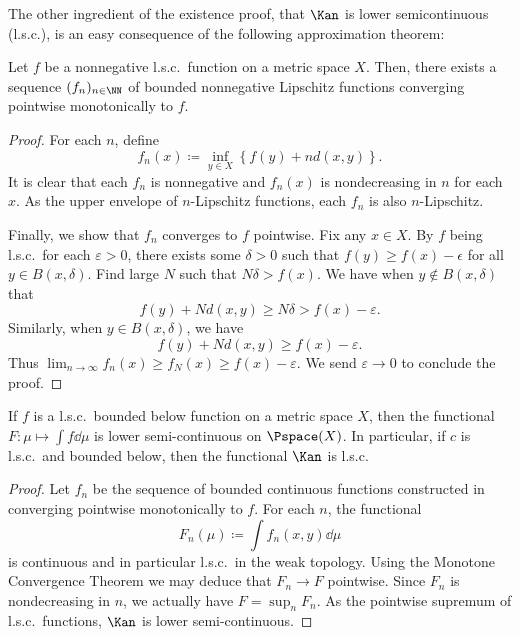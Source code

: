 \documentclass[oneside,reqno,letterpaper]{amsart}
\begin{document}
The other ingredient of the existence proof, that \(\Kan\) is lower semicontinuous (l.s.c.), is an easy consequence of the following approximation theorem:
\begin{lemma}\label{prop:lsc-approx-by-uc}
  Let \(f\) be a nonnegative l.s.c.\ function on a metric space \(X\).
  Then, there exists a sequence \((f_n)_{n \in \NN}\) of bounded nonnegative Lipschitz functions converging pointwise monotonically to \(f\).
\end{lemma}
\begin{proof}
  For each \(n\), define
  \[
    f_n(x) \coloneqq \inf_{y \in X} \left\{ f(y) + n d(x, y) \right\}.
  \]
  It is clear that each \(f_n\) is nonnegative and \(f_n(x)\) is nondecreasing in \(n\) for each \(x\).
  As the upper envelope of \(n\)-Lipschitz functions, each \(f_n\) is also \(n\)-Lipschitz.

  Finally, we show that \(f_n\) converges to \(f\) pointwise.
  Fix any \(x \in X\).
  By \(f\) being l.s.c.\, for each \(\varepsilon > 0\), there exists some \(\delta > 0\) such that \(f(y) \geq f(x) - \epsilon\) for all \(y \in B(x, \delta)\).
  Find large \(N\) such that \(N \delta > f(x)\).
  We have when \(y \notin B(x, \delta)\) that
  \[
    f(y) + N d(x, y)
    \geq N \delta
    > f(x) - \varepsilon.
  \]
  Similarly, when \(y \in B(x, \delta)\), we have
  \[
    f(y) + N d(x, y)
    \geq f(x) - \varepsilon.
  \]
  Thus \(\lim_{n \to \infty} f_n(x) \geq f_N(x) \geq f(x) - \varepsilon\).
  We send \(\varepsilon \to 0\) to conclude the proof.
\end{proof}
\begin{corollary}\label{prop:Kan-lsc}
  If \(f\) is a l.s.c.\, bounded below function on a metric space \(X\), then the functional \(F: \mu \mapsto \int f \dd \mu\) is lower semi-continuous on \(\Pspace(X)\).
  In particular, if \(c\) is l.s.c.\ and bounded below, then the functional \(\Kan\) is l.s.c.
\end{corollary}
\begin{proof}
  Let \(f_n\) be the sequence of bounded continuous functions constructed in  converging pointwise monotonically to \(f\).
  For each \(n\), the functional
  \[
    F_n(\mu) \coloneqq \int f_n(x, y) \dd \mu
  \]
  is continuous and in particular l.s.c.\ in the weak topology.
  Using the Monotone Convergence Theorem we may deduce that \(F_n \to F\) pointwise.
  Since \(F_n\) is nondecreasing in \(n\), we actually have \(F = \sup_n F_n\).
  As the pointwise supremum of l.s.c.\ functions, \(\Kan\) is lower semi-continuous.
\end{proof}
\end{document}
